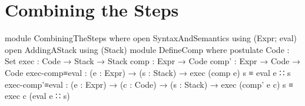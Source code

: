 \documentclass{article}
\begin{document}
\section{Combining the Steps}

\begin{code}
module CombiningTheSteps where
  open SyntaxAndSemantics using (Expr; eval)
  open AddingAStack using (Stack)
  module DefineComp where
    postulate
      Code : Set
      exec : Code → Stack → Stack
      comp : Expr → Code
      comp' : Expr → Code → Code
      exec-comp≡eval : (e : Expr) → (s : Stack)
        → exec (comp e) s ≡ eval e ∷ s
      exec-comp'≡eval : (e : Expr) → (c : Code) → (s : Stack)
        → exec (comp' e c) s ≡ exec c (eval e ∷ s)

\end{code}
\end{document}
